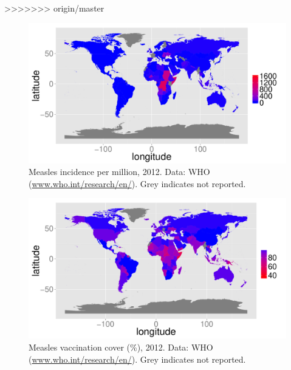 \documentclass{article}
\begin{document}
\begin{itemize}
>>>>>>> origin/master


\begin{figure}
\begin{center}
\includegraphics{draftfinalreport-037}
\end{center}
\caption{Measles incidence per million, 2012. Data: WHO (\href{http://www.who.int/research/en/}{www.who.int/research/en/}). Grey indicates not reported.}
\label{fig:incidence12}
\end{figure}

\begin{figure}
\begin{center}
\includegraphics{draftfinalreport-038}
\end{center}
\caption{Measles vaccination cover (\%), 2012. Data: WHO (\href{http://www.who.int/research/en/}{www.who.int/research/en/}). Grey indicates not reported.}
\label{fig:cover12}
\end{figure}



\end{itemize}
\end{document}

